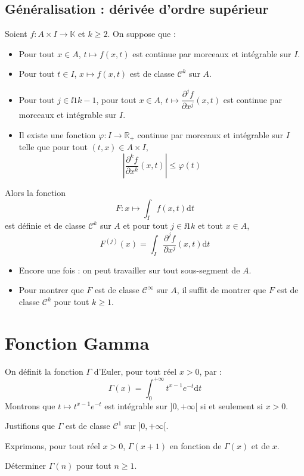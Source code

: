 \documentclass[french,11pt,twoside]{VcCours}
\newcommand{\dt}{\text{d}t}
\begin{document}
\newpage
\subsection{Généralisation : dérivée d'ordre supérieur}
\begin{Theoreme}{}
Soient $f : A \times I \rightarrow \mathbb{K}$ et $k \geq 2$. On suppose que :
\begin{itemize}
\item Pour tout $x \in A$, $t \mapsto f(x,t)$ est continue par morceaux et intégrable sur $I$.
\item Pour tout $t \in I$, $x \mapsto f(x,t)$ est de classe $\mathcal{C}^k$ sur $A$.
\item Pour tout $j \in \ii{1}{k-1}$, pour tout $x \in A$, $t \mapsto \dfrac{\partial^j f}{\partial x^j}(x,t)$ est continue par morceaux et intégrable sur $I$.
\item Il existe une fonction $\varphi : I \rightarrow \mathbb{R}_+$ continue par morceaux et intégrable sur $I$ telle que pour tout $(t,x) \in A \times I$,
$$ \left\vert \dfrac{\partial^k f}{\partial x^k}(x,t) \right\vert \leq \varphi(t)$$
\end{itemize}
Alors la fonction 
$$ F : x \mapsto \int_{I} f(x,t) \dt$$
est définie et de classe $\mathcal{C}^k$ sur $A$ et pour tout $j \in \ii{1}{k}$ et tout $x \in A$,
$$ F^{(j)}(x) = \int_{I}  \dfrac{\partial^{j} f}{\partial x^j}(x,t) \dt$$
\end{Theoreme}

\begin{Remarques}{}
\begin{itemize}
\item Encore une fois : on peut travailler sur tout sous-segment de $A$.
\item Pour montrer que $F$ est de classe $\mathcal{C}^{\infty}$ sur $A$, il suffit de montrer que $F$ est de classe $\mathcal{C}^k$ pour tout $k \geq 1$.
\end{itemize}
\end{Remarques}{}
\section{Fonction Gamma}
On définit la fonction $\Gamma$ d'Euler, pour tout réel $x>0$, par :
$$ \Gamma(x) = \int_{0}^{+ \infty} t^{x-1} e^{-t} \dt$$
Montrons que $t \mapsto  t^{x-1} e^{-t}$ est intégrable sur $]0, + \infty[$ si et seulement si $x>0$.

\vspace{6cm}

\newpage

Justifions que $\Gamma$ est de classe $\mathcal{C}^1$ sur $]0, + \infty[$.

\vspace{13cm}



Exprimons, pour tout réel $x>0$, $\Gamma(x+1)$ en fonction de $\Gamma(x)$ et de $x$.

\vspace{7cm}



Déterminer $\Gamma(n)$ pour tout $n \geq 1$.

\end{document}
